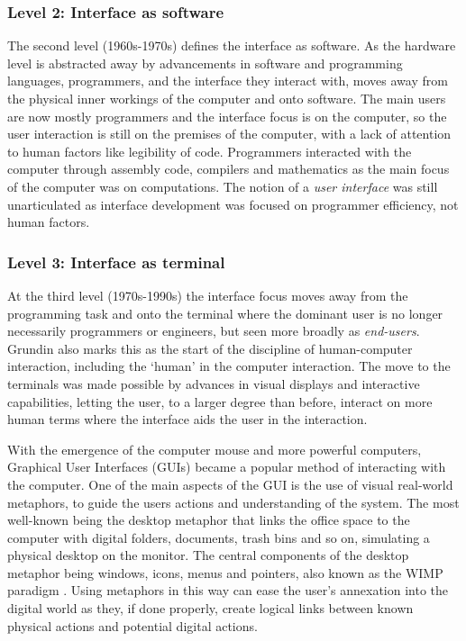 \subsubsection{Level 2: Interface as software}
The second level (1960s-1970s) defines the interface as software.
As the hardware level is abstracted away by advancements in software and programming languages, programmers, and the interface they interact with, moves away from the physical inner workings of the computer and onto software.
The main users are now mostly programmers and the interface focus is on the computer, so the user interaction is still on the premises of the computer, with a lack of attention to human factors like legibility of code.
Programmers interacted with the computer through assembly code, compilers and mathematics as the main focus of the computer was on computations. The notion of a \emph{user interface} was still unarticulated as interface development was focused on programmer efficiency, not human factors.

\subsubsection{Level 3: Interface as terminal}
At the third level (1970s-1990s) the interface focus moves away from the programming task and onto the terminal where the dominant user is no longer necessarily programmers or engineers, but seen more broadly as \emph{end-users}.
Grundin also marks this as the start of the discipline of human-computer interaction, including the `human' in the computer interaction.
The move to the terminals was made possible by advances in visual displays and interactive capabilities, letting the user, to a larger degree than before, interact on more human terms where the interface aids the user in the interaction.

With the emergence of the computer mouse and more powerful computers, Graphical User Interfaces (GUIs) became a popular method of interacting with the computer.
One of the main aspects of the GUI is the use of visual real-world metaphors, to guide the users actions and understanding of the system.
The most well-known being the desktop metaphor that links the office space to the computer with digital folders, documents, trash bins and so on, simulating a physical desktop on the monitor.
The central components of the desktop metaphor being windows, icons, menus and pointers, also known as the WIMP paradigm \citep[chap. 6]{krumm2009ubiquitous}. 
Using metaphors in this way can ease the user's annexation into the digital world as they, if done properly, create logical links between known physical actions and potential digital actions.

